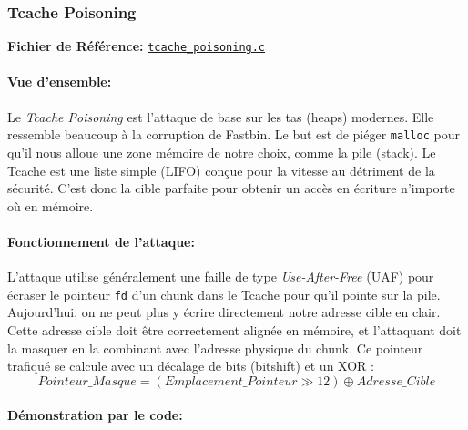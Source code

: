 
\subsubsection{Tcache Poisoning}

\noindent\textbf{Fichier de Référence:} \href{https://github.com/shellphish/how2heap/blob/master/glibc_2.41/tcache_poisoning.c}{\texttt{tcache\_poisoning.c}}

\paragraph{Vue d'ensemble:}
Le \textit{Tcache Poisoning} est l'attaque de base sur les tas (heaps) modernes. Elle ressemble beaucoup à la corruption de Fastbin. Le but est de piéger \texttt{malloc} pour qu'il nous alloue une zone mémoire de notre choix, comme la pile (stack). Le Tcache est une liste simple (LIFO) conçue pour la vitesse au détriment de la sécurité. C'est donc la cible parfaite pour obtenir un accès en écriture n'importe où en mémoire.

\paragraph{Fonctionnement de l'attaque:}
L'attaque utilise généralement une faille de type \textit{Use-After-Free} (UAF) pour écraser
le pointeur \texttt{fd} d'un chunk dans le Tcache pour qu'il pointe sur la pile.
Aujourd'hui, on ne peut plus y écrire directement notre adresse cible en clair.
Cette adresse cible doit être correctement alignée en mémoire, et l'attaquant doit la masquer en
la combinant avec l'adresse physique du chunk.
Ce pointeur trafiqué se calcule avec un décalage de bits (bitshift) et un XOR :
$$Pointeur\_Masque = (Emplacement\_Pointeur \gg 12) \oplus Adresse\_Cible$$

\paragraph{Démonstration par le code:}

